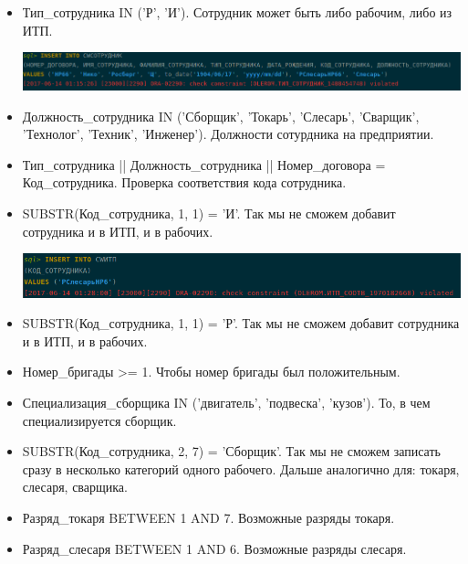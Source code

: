 \begin{itemize}

    \item Тип\_сотрудника IN ('Р', 'И'). Сотрудник может быть либо рабочим, либо из ИТП.

    \includegraphics[width=17cm]{./screenshots/constraints/employee1.png}

    \item Должность\_сотрудника IN ('Сборщик', 'Токарь', 'Слесарь', 'Сварщик', 'Технолог', 'Техник', 'Инженер').
    Должности сотурдника на предприятии.

    \item Тип\_сотрудника || Должность\_сотрудника || Номер\_договора = Код\_сотрудника.
    Проверка соответствия кода сотрудника.

    \item  SUBSTR(Код\_сотрудника, 1, 1) = 'И'.
    Так мы не сможем добавит сотрудника и в ИТП, и в рабочих.

    \includegraphics[width=17cm]{./screenshots/constraints/itp.png}

    \item SUBSTR(Код\_сотрудника, 1, 1) = 'Р'.
    Так мы не сможем добавит сотрудника и в ИТП, и в рабочих.

    \item Номер\_бригады >= 1.
    Чтобы номер бригады был положительным.

    \item Специализация\_сборщика IN ('двигатель', 'подвеска', 'кузов').
    То, в чем специализируется сборщик.

    \item SUBSTR(Код\_сотрудника, 2, 7) = 'Сборщик'.
    Так мы не сможем записать сразу в несколько категорий одного рабочего.
    Дальше аналогично для: токаря, слесаря, сварщика.

    \item Разряд\_токаря BETWEEN 1 AND 7.
    Возможные разряды токаря.

    \item Разряд\_слесаря BETWEEN 1 AND 6.
    Возможные разряды слесаря.


\end{itemize}

